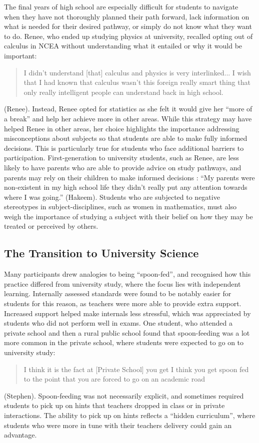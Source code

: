 \documentclass[a4paper,man,natbib]{apa6}
\begin{document}
The final years of high school are especially difficult for students to navigate when they have not thoroughly planned their path forward, lack information on what is needed for their desired pathway, or simply do not know what they want to do. Renee, who ended up studying physics at university, recalled opting out of calculus in NCEA without understanding what it entailed or why it would be important: \blockquote{I didn't understand [that] calculus and physics is very interlinked... I wish that I had known that calculus wasn't this foreign really smart thing that only really intelligent people can understand back in high school.} (Renee). Instead, Renee opted for statistics as she felt it would give her ``more of a break'' and help her achieve more in other areas. While this strategy may have helped Renee in other areas, her choice highlights the importance addressing misconceptions about subjects so that students are able to make fully informed decisions. This is particularly true for students who face additional barriers to participation. First-generation to university students, such as Renee, are less likely to have parents who are able to provide advice on study pathways, and parents may rely on their children to make informed decisions \citep{madjar2009towards}: ``My parents were non-existent in my high school life they didn't really put any attention towards where I was going.'' (Hakeem). Students who are subjected to negative stereotypes in subject-disciplines, such as women in mathematics, must also weigh the importance of studying a subject with their belief on how they may be treated or perceived by others. 

\subsection{The Transition to University Science}
Many participants drew analogies to being ``spoon-fed'', and recognised how this practice differed from university study, where the focus lies with independent learning. Internally assessed standards were found to be notably easier for students for this reason, as teachers were more able to provide extra support. Increased support helped make internals less stressful, which was appreciated by students who did not perform well in exams. One student, who attended a private school and then a rural public school found that spoon-feeding was a lot more common in the private school, where students were expected to go on to university study: \blockquote{I think it is the fact at [Private School] you get I think you get spoon fed to the point that you are forced to go on an academic road}. (Stephen). Spoon-feeding was not necessarily explicit, and sometimes required students to pick up on hints that teachers dropped in class or in private interactions. The ability to pick up on hints reflects a ``hidden curriculum'', where students who were more in tune with their teachers delivery could gain an advantage. 
\end{document}
